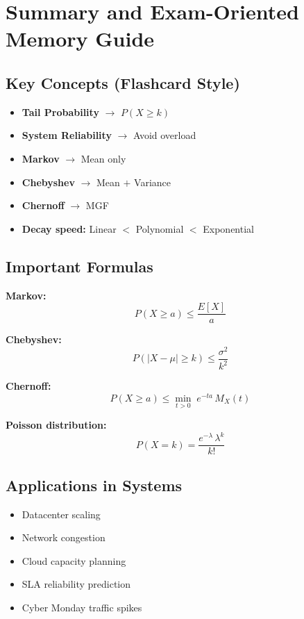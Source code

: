 \documentclass[12pt, a4paper]{article}
\newcommand{\EX}[1]{E\!\left[#1\right]}
\begin{document}
\section{Summary and Exam-Oriented Memory Guide}

\subsection*{Key Concepts (Flashcard Style)}

\begin{itemize}[leftmargin=2em]
  \item \textbf{Tail Probability} $\longrightarrow$ $P(X \geq k)$
  \item \textbf{System Reliability} $\longrightarrow$ Avoid overload
  \item \textbf{Markov} $\longrightarrow$ Mean only
  \item \textbf{Chebyshev} $\longrightarrow$ Mean $+$ Variance
  \item \textbf{Chernoff} $\longrightarrow$ MGF
  \item \textbf{Decay speed:} Linear $<$ Polynomial $<$ Exponential
\end{itemize}

\subsection*{Important Formulas}

\begin{tcolorbox}[colback=lightgray, colframe=accentblue, title=Formula Sheet]
  \textbf{Markov:}
  \[
    P(X \geq a) \leq \frac{\EX{X}}{a}
  \]

  \textbf{Chebyshev:}
  \[
    P(|X - \mu| \geq k) \leq \frac{\sigma^2}{k^2}
  \]

  \textbf{Chernoff:}
  \[
    P(X \geq a) \leq \min_{t > 0}\; e^{-ta}\,M_X(t)
  \]

  \textbf{Poisson distribution:}
  \[
    P(X = k) = \frac{e^{-\lambda}\,\lambda^k}{k!}
  \]
\end{tcolorbox}

\subsection*{Applications in Systems}

\begin{itemize}[leftmargin=2em]
  \item Datacenter scaling
  \item Network congestion
  \item Cloud capacity planning
  \item SLA reliability prediction
  \item Cyber Monday traffic spikes
\end{itemize}
\end{document}

